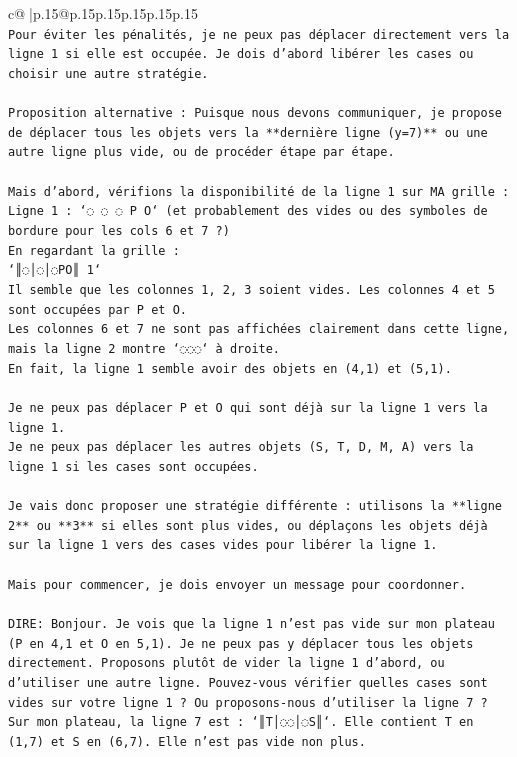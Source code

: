 \documentclass{article}
\begin{document}
{\begin{supertabular}{c@{$\;$}|p{.15\linewidth}@{}p{.15\linewidth}p{.15\linewidth}p{.15\linewidth}p{.15\linewidth}p{.15\linewidth}}
{{{\\ 
\texttt{Pour éviter les pénalités, je ne peux pas déplacer directement vers la ligne 1 si elle est occupée. Je dois d'abord libérer les cases ou choisir une autre stratégie.} \\
\\ 
\texttt{Proposition alternative : Puisque nous devons communiquer, je propose de déplacer tous les objets vers la **dernière ligne (y=7)** ou une autre ligne plus vide, ou de procéder étape par étape.} \\
\\ 
\texttt{Mais d'abord, vérifions la disponibilité de la ligne 1 sur MA grille :} \\
\texttt{Ligne 1 : `◌ ◌ ◌ P O` (et probablement des vides ou des symboles de bordure pour les cols 6 et 7 ?)} \\
\texttt{En regardant la grille :} \\
\texttt{`║◌│◌│◌PO║ 1`} \\
\texttt{Il semble que les colonnes 1, 2, 3 soient vides. Les colonnes 4 et 5 sont occupées par P et O.} \\
\texttt{Les colonnes 6 et 7 ne sont pas affichées clairement dans cette ligne, mais la ligne 2 montre `◌◌◌` à droite.} \\
\texttt{En fait, la ligne 1 semble avoir des objets en (4,1) et (5,1).} \\
\\ 
\texttt{Je ne peux pas déplacer P et O qui sont déjà sur la ligne 1 vers la ligne 1.} \\
\texttt{Je ne peux pas déplacer les autres objets (S, T, D, M, A) vers la ligne 1 si les cases sont occupées.} \\
\\ 
\texttt{Je vais donc proposer une stratégie différente : utilisons la **ligne 2** ou **3** si elles sont plus vides, ou déplaçons les objets déjà sur la ligne 1 vers des cases vides pour libérer la ligne 1.} \\
\\ 
\texttt{Mais pour commencer, je dois envoyer un message pour coordonner.} \\
\\ 
\texttt{DIRE: Bonjour. Je vois que la ligne 1 n'est pas vide sur mon plateau (P en 4,1 et O en 5,1). Je ne peux pas y déplacer tous les objets directement. Proposons plutôt de vider la ligne 1 d'abord, ou d'utiliser une autre ligne. Pouvez{-}vous vérifier quelles cases sont vides sur votre ligne 1 ? Ou proposons{-}nous d'utiliser la ligne 7 ? Sur mon plateau, la ligne 7 est : `║T│◌◌│◌S║`. Elle contient T en (1,7) et S en (6,7). Elle n'est pas vide non plus.} \\
}}}
\end{supertabular}}
\end{document}
